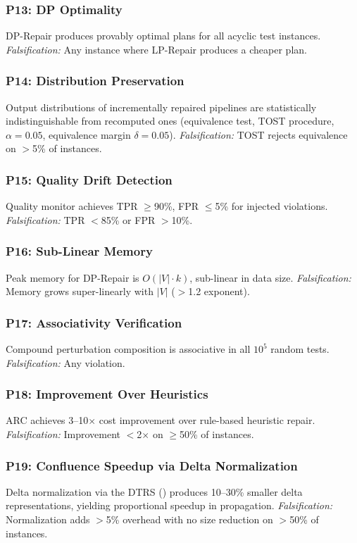 \documentclass[11pt,a4paper]{article}
\theoremstyle{definition}
\begin{document}
\subsubsection{P13: DP Optimality}
DP-Repair produces provably optimal plans for all acyclic test instances.
\emph{Falsification:} Any instance where LP-Repair produces a cheaper plan.

\subsubsection{P14: Distribution Preservation}
Output distributions of incrementally repaired pipelines are statistically
indistinguishable from recomputed ones (equivalence test, TOST procedure,
$\alpha = 0.05$, equivalence margin $\delta = 0.05$).
\emph{Falsification:} TOST rejects equivalence on $>$5\% of instances.

\subsubsection{P15: Quality Drift Detection}
Quality monitor achieves TPR $\geq$90\%, FPR $\leq$5\% for injected violations.
\emph{Falsification:} TPR $<$85\% or FPR $>$10\%.

\subsubsection{P16: Sub-Linear Memory}
Peak memory for DP-Repair is $O(|V| \cdot k)$, sub-linear in data size.
\emph{Falsification:} Memory grows super-linearly with $|V|$ ($>$1.2 exponent).

\subsubsection{P17: Associativity Verification}
Compound perturbation composition is associative in all $10^5$ random tests.
\emph{Falsification:} Any violation.

\subsubsection{P18: Improvement Over Heuristics}
ARC achieves 3--10$\times$ cost improvement over rule-based heuristic repair.
\emph{Falsification:} Improvement $<$2$\times$ on $\geq$50\% of instances.

\subsubsection{P19: Confluence Speedup via Delta Normalization}
Delta normalization via the DTRS () produces 10--30\% smaller
delta representations, yielding proportional speedup in propagation.
\emph{Falsification:} Normalization adds $>$5\% overhead with no size
reduction on $>$50\% of instances.
\end{document}
